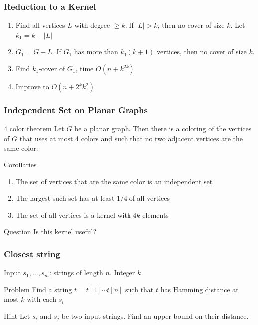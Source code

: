 \documentclass[12pt,aspectratio=169]{beamer}
\begin{document}
\begin{frame}\frametitle{Reduction to a Kernel}
  \begin{enumerate}
  \item
    Find all vertices $L$ with degree $\ge k$.
%
    If $|L|>k$, then no cover of size $k$.
%
    Let $k_{1} = k - |L|$
  \item
    $G_{1} = G - L$.
%
    If $G_{1}$ has more than $k_{1}(k+1)$ vertices, then no cover of size $k$.
  \item
    Find  $k_{1}$-cover of $G_{1}$, time $O(n + k^{2k})$
  \item
    Improve to $O(n + 2^{k}k^{2})$
  \end{enumerate}
\end{frame}

\begin{frame}\frametitle{Independent Set on Planar Graphs}
\begin{block}{4 color theorem}
Let $G$ be a planar graph.
Then there is a coloring of the vertices of $G$ that uses at most 4 colors and
such that no two adjacent vertices are the same color.
\end{block}

\begin{block}{Corollaries}
\begin{enumerate}
    \item
The set of vertices that are the same color is an independent set
\item
    The largest such set has at least $1/4$ of all vertices
\item
    The set of all vertices is a kernel with $4k$ elements
\end{enumerate}
\end{block}


\begin{block}{Question}
Is this kernel useful? 
\end{block}
\end{frame}
\begin{frame}\frametitle{Closest string }
    \begin{block}{Input}
      $s_{1}, \ldots, s_{m}$: strings of length $n$.
      Integer $k$
    \end{block}

    \begin{block}{Problem}
      Find a string $t=t[1]\cdots t[n]$ such that $t$ has Hamming distance at most $k$
      with each $s_{i}$
    \end{block}
     \begin{block}{Hint}
      Let $s_{i}$ and $s_{j}$ be two input strings.
Find an upper bound on their distance. 
    \end{block}
 \end{frame}
\end{document}
